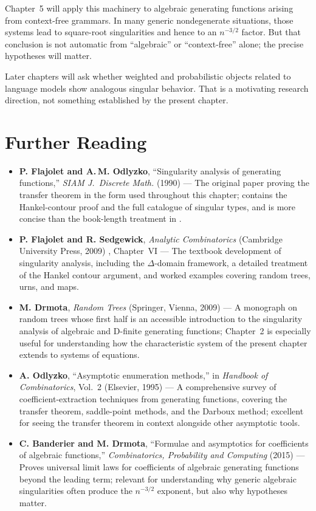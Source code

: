 Chapter~5 will apply this machinery to algebraic generating functions arising from context-free grammars. In many generic nondegenerate situations, those systems lead to square-root singularities and hence to an $n^{-3/2}$ factor. But that conclusion is not automatic from ``algebraic'' or ``context-free'' alone; the precise hypotheses will matter.

Later chapters will ask whether weighted and probabilistic objects related to language models show analogous singular behavior. That is a motivating research direction, not something established by the present chapter.

\section*{Further Reading}

\begin{itemize}
  \item \textbf{P. Flajolet and A.\,M. Odlyzko}, ``Singularity analysis of generating functions,'' \emph{SIAM J.\ Discrete Math.} (1990) \cite{FlajoletOdlyzko1990} --- The original paper proving the transfer theorem in the form used throughout this chapter; contains the Hankel-contour proof and the full catalogue of singular types, and is more concise than the book-length treatment in \cite{FlajoletSedgewick2009}.

  \item \textbf{P. Flajolet and R. Sedgewick}, \emph{Analytic Combinatorics} (Cambridge University Press, 2009) \cite{FlajoletSedgewick2009}, Chapter~VI --- The textbook development of singularity analysis, including the $\Delta$-domain framework, a detailed treatment of the Hankel contour argument, and worked examples covering random trees, urns, and maps.

  \item \textbf{M. Drmota}, \emph{Random Trees} (Springer, Vienna, 2009) \cite{Drmota2009} --- A monograph on random trees whose first half is an accessible introduction to the singularity analysis of algebraic and D-finite generating functions; Chapter~2 is especially useful for understanding how the characteristic system of the present chapter extends to systems of equations.

  \item \textbf{A. Odlyzko}, ``Asymptotic enumeration methods,'' in \emph{Handbook of Combinatorics}, Vol.~2 (Elsevier, 1995) --- A comprehensive survey of coefficient-extraction techniques from generating functions, covering the transfer theorem, saddle-point methods, and the Darboux method; excellent for seeing the transfer theorem in context alongside other asymptotic tools.

  \item \textbf{C. Banderier and M. Drmota}, ``Formulae and asymptotics for coefficients of algebraic functions,'' \emph{Combinatorics, Probability and Computing} (2015) \cite{BanderierDrmota2015} --- Proves universal limit laws for coefficients of algebraic generating functions beyond the leading term; relevant for understanding why generic algebraic singularities often produce the $n^{-3/2}$ exponent, but also why hypotheses matter.
\end{itemize}
